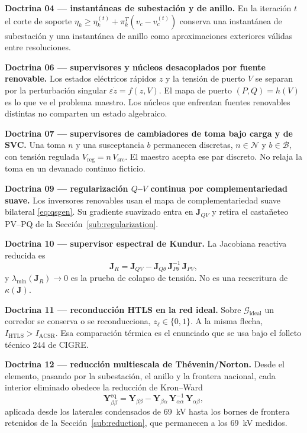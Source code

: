 \textbf{Doctrina 04 --- instantáneas de subestación y de anillo.} En la iteración $t$ el corte de soporte $\eta_k\ge\eta_k^{(t)}+\pi_k^{T}(v_c-v_c^{(t)})$ conserva una instantánea de subestación y una instantánea de anillo como aproximaciones exteriores válidas entre resoluciones.

\textbf{Doctrina 06 --- supervisores y núcleos desacoplados por fuente renovable.} Los estados eléctricos rápidos $z$ y la tensión de puerto $V$ se separan por la perturbación singular $\varepsilon\dot{z}=f(z,V)$. El mapa de puerto $(P,Q)=h(V)$ es lo que ve el problema maestro. Los núcleos que enfrentan fuentes renovables distintas no comparten un estado algebraico.

\textbf{Doctrina 07 --- supervisores de cambiadores de toma bajo carga y de SVC.} Una toma $n$ y una susceptancia $b$ permanecen discretas, $n\in\mathcal{N}$ y $b\in\mathcal{B}$, con tensión regulada $V_{\mathrm{reg}}=n\,V_{\mathrm{src}}$. El maestro acepta ese par discreto. No relaja la toma en un devanado continuo ficticio.

\textbf{Doctrina 09 --- regularización $Q$--$V$ continua por complementariedad suave.} Los inversores renovables usan el mapa de complementariedad suave bilateral \eqref{eq:qsgen}. Su gradiente suavizado entra en $\mathbf{J}_{QV}$ y retira el castañeteo PV--PQ de la Sección~\ref{sub:regularization}.

\textbf{Doctrina 10 --- supervisor espectral de Kundur.} La Jacobiana reactiva reducida es
\begin{equation}
\mathbf{J}_R = \mathbf{J}_{QV} - \mathbf{J}_{Q\theta}\, \mathbf{J}_{P\theta}^{-1}\, \mathbf{J}_{PV},
\label{eq:jr}
\end{equation}
y $\lambda_{\min}(\mathbf{J}_R)\to 0$ es la prueba de colapso de tensión. No es una reescritura de $\kappa(\mathbf{J})$.

\textbf{Doctrina 11 --- reconducción HTLS en la red ideal.} Sobre $\mathcal{G}_{\mathrm{ideal}}$ un corredor se conserva o se reconducciona, $z_{\ell}\in\{0,1\}$. A la misma flecha, $I_{\mathrm{HTLS}}>I_{\mathrm{ACSR}}$. Esa comparación térmica es el enunciado que se usa bajo el folleto técnico 244 de CIGRE.

\textbf{Doctrina 12 --- reducción multiescala de Th\'evenin/Norton.} Desde el elemento, pasando por la subestación, el anillo y la frontera nacional, cada interior eliminado obedece la reducción de Kron--Ward
\begin{equation}
\mathbf{Y}_{\beta\beta}^{\mathrm{eq}} = \mathbf{Y}_{\beta\beta} - \mathbf{Y}_{\beta\alpha}\, \mathbf{Y}_{\alpha\alpha}^{-1}\, \mathbf{Y}_{\alpha\beta},
\label{eq:matrioshka}
\end{equation}
aplicada desde los laterales condensados de 69~kV hasta los bornes de frontera retenidos de la Sección~\ref{sub:reduction}, que permanecen a los 69~kV medidos.

